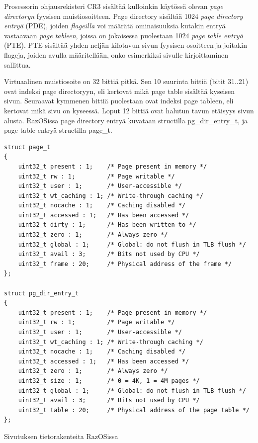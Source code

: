 Prosessorin ohjausrekisteri CR3 sisältää kulloinkin käytössä olevan \textit{page directoryn} fyysisen muistiosoitteen. Page directory sisältää 1024 \textit{page directory entryä} (PDE), joiden \textit{flageilla} voi määrätä ominaisuuksia kutakin entryä vastaavaan \textit{page tableen}, joissa on jokaisessa puolestaan 1024 \textit{page table entryä} (PTE). PTE sisältää yhden neljän kilotavun sivun fyysisen osoitteen ja joitakin flageja, joiden avulla määritellään, onko esimerkiksi sivulle kirjoittaminen sallittua.

\par

Virtuaalinen muistiosoite on 32 bittiä pitkä. Sen 10 suurinta bittiä (bitit 31..21) ovat indeksi page directoryyn, eli kertovat mikä page table sisältää kyseisen sivun. Seuraavat kymmenen bittiä puolestaan ovat indeksi page tableen, eli kertovat mikä sivu on kyseessä. Loput 12 bittiä ovat halutun tavun etäisyys sivun alusta. RazOSissa page directory entryä kuvataan structilla pg\_dir\_entry\_t, ja page table entryä structilla page\_t.

\begin{listing}[H]
\begin{verbatim}
struct page_t
{
	uint32_t present : 1;    /* Page present in memory */
	uint32_t rw : 1;         /* Page writable */
	uint32_t user : 1;       /* User-accessible */
	uint32_t wt_caching : 1; /* Write-through caching */
	uint32_t nocache : 1;    /* Caching disabled */
	uint32_t accessed : 1;   /* Has been accessed */
	uint32_t dirty : 1;      /* Has been written to */
	uint32_t zero : 1;       /* Always zero */
	uint32_t global : 1;     /* Global: do not flush in TLB flush */
	uint32_t avail : 3;      /* Bits not used by CPU */
	uint32_t frame : 20;     /* Physical address of the frame */
};

struct pg_dir_entry_t
{
	uint32_t present : 1;    /* Page present in memory */
	uint32_t rw : 1;         /* Page writable */
	uint32_t user : 1;       /* User-accessible */
	uint32_t wt_caching : 1; /* Write-through caching */
	uint32_t nocache : 1;    /* Caching disabled */
	uint32_t accessed : 1;   /* Has been accessed */
	uint32_t zero : 1;       /* Always zero */
	uint32_t size : 1;       /* 0 = 4K, 1 = 4M pages */
	uint32_t global : 1;     /* Global: do not flush in TLB flush */
	uint32_t avail : 3;      /* Bits not used by CPU */
	uint32_t table : 20;     /* Physical address of the page table */
};
\end{verbatim}
\caption{Sivutuksen tietorakenteita RazOSissa}
\label{lst:paging_structs}
\end{listing}

